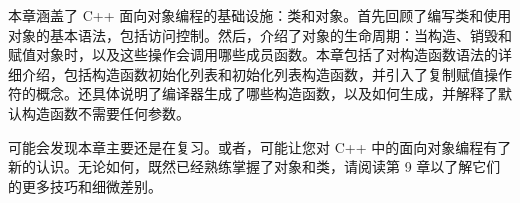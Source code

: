 本章涵盖了 C++ 面向对象编程的基础设施：类和对象。首先回顾了编写类和使用对象的基本语法，包括访问控制。然后，介绍了对象的生命周期：当构造、销毁和赋值对象时，以及这些操作会调用哪些成员函数。本章包括了对构造函数语法的详细介绍，包括构造函数初始化列表和初始化列表构造函数，并引入了复制赋值操作符的概念。还具体说明了编译器生成了哪些构造函数，以及如何生成，并解释了默认构造函数不需要任何参数。

可能会发现本章主要还是在复习。或者，可能让您对 C++ 中的面向对象编程有了新的认识。无论如何，既然已经熟练掌握了对象和类，请阅读第 9 章以了解它们的更多技巧和细微差别。